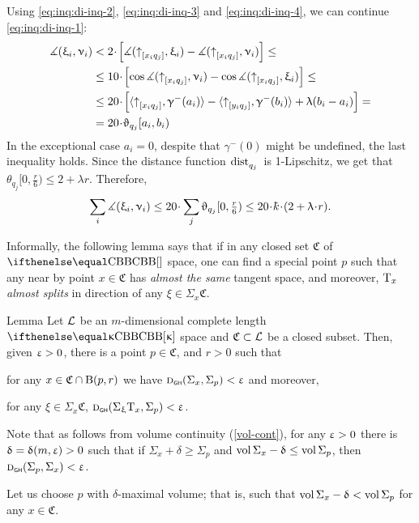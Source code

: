 Using \ref{eq:inq:di-inq-2}, \ref{eq:inq:di-inq-3} and \ref{eq:inq:di-inq-4}, we can continue \ref{eq:inq:di-inq-1}:
\begin{align*}
\mangle(\xi_i,\nu_i)
&<
2\cdot\l[\mangle(\dir{x_i}{q_j},\xi_i)-\mangle(\dir{x_i}{q_j},\nu_i)\r]
\le
\\
&\le 10\cdot\l[\cos\mangle(\dir{x_i}{q_j},\nu_i)-\cos\mangle(\dir{x_i}{q_j},\xi_i)\r]
\le
\\
&\le 20\cdot\l[\<\dir{x_i}{q_j},\gamma^-(a_i)\>-\<\dir{y_i}{q_j},\gamma^-(b_i)\>+\lambda (b_i-a_i)\r]
=
\\
&=20\cdot\theta_{q_j}[a_i,b_i)
\end{align*}
In the exceptional case $a_i=0$, despite that $\gamma^-(0)$ might be undefined, the last inequality holds.
Since the distance function $\mathop{\rm dist}\nolimits_{q_j}^{{}}{}{}$ is 1-Lipschitz, we get that $\theta_{q_j}[0,\tfrac{r}{6})\le 2+\lambda r$.
Therefore,
\[\sum_i\mangle(\xi_i,\nu_i)
\le 
20\cdot\sum_{j}\theta_{q_j}[0,\tfrac{r}{6})
\le 20\cdot \kay\cdot(2+\lambda\cdot r).\]
\qedqedsf

Informally, the following lemma says that if in any closed set $\mathfrak C$ of $\Alex{}$ space, one can find a special point $p$ such that any near by point $x\in\mathfrak C$ has \emph{almost the same} tangent space, and moreover, $\text{\rm T}_x$ \emph{almost splits} in direction of any $\xi\in\Sigma_x \mathfrak C$.

\begin{thm}{Lemma} \label{lem:amost=Sigma}
Let $\mathcal{L}$ be an $m$-dimensional complete length $\Alex{\kappa}$ space and $\mathfrak C\subset \spc{L}$ be a closed subset.
Then, given $\upvarepsilon>0$,
there is a point $p\in \mathfrak C$, and $r>0$ 
such that 
\begin{subthm}{}for any $x\in\mathfrak C\cap \oBall(p,r)$ we have
$\text{\sc d}_{\text{\sf\tiny GH}}(\Sigma_x,\Sigma_p)<\upvarepsilon$ and moreover,
\end{subthm}
\begin{subthm}{} for any $\xi\in\Sigma_x\mathfrak C$, $\text{\sc d}_{\text{\sf\tiny GH}}(\Sigma_\upxi\text{\rm T}_x,\Sigma_p)<\upvarepsilon$.
\end{subthm}
\end{thm}

Note that as follows from volume continuity (\ref{vol-cont}),
for any $\upvarepsilon>0$ there is $\updelta=\updelta(m,\upvarepsilon)>0$ such that if $\Sigma_x+\delta\ge\Sigma_p$ and $\vol\Sigma_x-\delta\le\vol\Sigma_p$, then
$\text{\sc d}_{\text{\sf\tiny GH}}(\Sigma_p,\Sigma_x)<\upvarepsilon$.

Let us choose $p$ with $\delta$-maximal volume;
that is, such that $\mathop{\rm vol}\nolimits\Sigma_x-\updelta<\mathop{\rm vol}\nolimits\Sigma_p$ for any $x\in \mathfrak C$.

